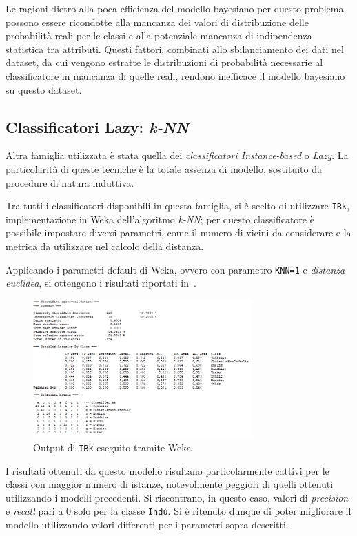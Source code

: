 \documentclass[a4paper,11pt,twoside,notitlepage,final]{scrartcl}
\begin{document}
Le ragioni dietro alla poca efficienza del modello bayesiano per questo problema possono essere ricondotte alla mancanza dei valori di distribuzione delle probabilità reali per le classi e alla potenziale mancanza di indipendenza statistica tra attributi.
Questi fattori, combinati allo sbilanciamento dei dati nel dataset, da cui vengono estratte le distribuzioni di probabilità necessarie al classificatore in mancanza di quelle reali, rendono inefficace il modello bayesiano su questo dataset.

\subsection{Classificatori Lazy: \emph{k-NN}}\label{subsec:ibk}

Altra famiglia utilizzata è stata quella dei \emph{classificatori Instance-based} o \emph{Lazy}.
La particolarità di queste tecniche è la totale assenza di modello, sostituito da procedure di natura induttiva.

Tra tutti i classificatori disponibili in questa famiglia, si è scelto di utilizzare \texttt{IBk}, implementazione in Weka dell'algoritmo \emph{k-NN};
per questo classificatore è possibile impostare diversi parametri, come il numero di vicini da considerare e la metrica da utilizzare nel calcolo della distanza.

Applicando i parametri default di Weka, ovvero con parametro \texttt{KNN=1} e \emph{distanza euclidea}, si ottengono i risultati riportati in~.

\begin{figure}[H]
  \centering
  \includegraphics[width=0.75\textwidth]{fig/kNN1.PNG}%
  \caption{Output di \texttt{IBk} eseguito tramite Weka}%
  \label{fig:ibk:1}
\end{figure}

I risultati ottenuti da questo modello risultano particolarmente cattivi per le classi con maggior numero di istanze, notevolmente peggiori di quelli ottenuti utilizzando i modelli precedenti.
Si riscontrano, in questo caso, valori di \emph{precision} e \emph{recall} pari a \(0\) solo per la classe \texttt{Indù}.
Si è ritenuto dunque di poter migliorare il modello utilizzando valori differenti per i parametri sopra descritti.
\end{document}
